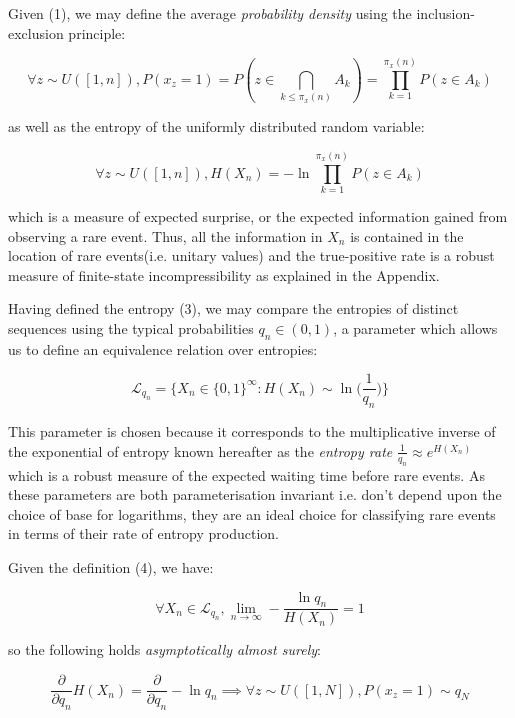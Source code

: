 \documentclass{article}
\begin{document}
Given (1), we may define the average \textit{probability density} using the inclusion-exclusion principle:

\begin{equation}
\forall z \sim U([1,n]), P(x_z =1) = P(z \in \bigcap_{k \leq \pi_x(n)} A_k) = \prod_{k=1}^{\pi_x(n)} P(z \in A_k)
\end{equation}

as well as the entropy of the uniformly distributed random variable:

\begin{equation}
\forall z \sim U([1,n]), H(X_n) = -\ln \prod_{k=1}^{\pi_x(n)} P(z \in A_k)
\end{equation}

which is a measure of expected surprise, or the expected information gained from observing a rare event. Thus, all the information in $X_n$ is contained in the location of rare events(i.e. unitary values) and the true-positive rate is a robust measure of finite-state incompressibility as explained in the Appendix. 

\newpage 

Having defined the entropy (3), we may compare the entropies of distinct sequences using the typical probabilities
$q_n \in (0,1)$, a parameter which allows us to define an equivalence relation over entropies:

\begin{equation}
\mathcal{L}_{q_n} = \{X_n \in \{0,1\}^{\infty}: H(X_n) \sim \ln \big(\frac{1}{q_n}\big) \}
\end{equation}

This parameter is chosen because it corresponds to the multiplicative inverse of the exponential of entropy known hereafter as the \textit{entropy rate} $\frac{1}{q_n} \approx e^{H(X_n)}	$ which is a robust measure of the expected waiting time before rare events. As these parameters are both parameterisation invariant i.e. don't depend upon the choice of base for logarithms, they are an ideal choice for classifying rare events in terms of their rate of entropy production. 

Given the definition (4), we have:

\begin{equation}
\forall X_n \in \mathcal{L}_{q_n}, \lim_{n \to \infty} -\frac{\ln q_n}{H(X_n)} = 1
\end{equation}

so the following holds \textit{asymptotically almost surely}: 

\begin{equation}
\frac{\partial}{\partial q_n} H(X_n) = \frac{\partial}{\partial q_n} -\ln q_n \implies \forall z \sim U([1,N]), P(x_z = 1) \sim q_N
\end{equation} 
\end{document}
